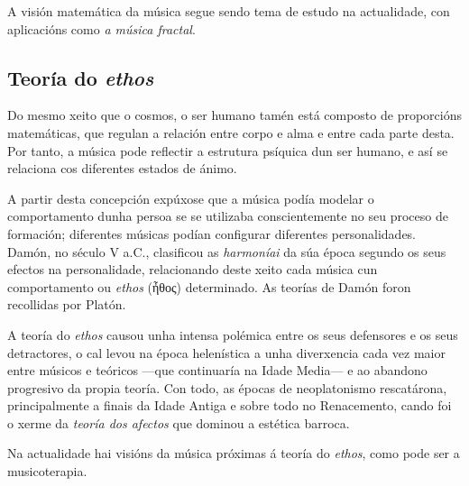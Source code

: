 A visión matemática da música segue sendo tema de estudo na actualidade,
con aplicacións como \emph{a música fractal}.

\hypertarget{teoruxeda-do--ethos}{%
\subsection*{\texorpdfstring{Teoría do
\emph{ethos}}{Teoría do ethos}}\label{teoruxeda-do--ethos}}

Do mesmo xeito que o cosmos, o ser humano tamén está composto de
proporcións matemáticas, que regulan a relación entre corpo e alma e
entre cada parte desta. Por tanto, a música pode reflectir a estrutura
psíquica dun ser humano, e así se relaciona cos diferentes estados de
ánimo.

A partir desta concepción expúxose que a música podía modelar o
comportamento dunha persoa se se utilizaba conscientemente no seu
proceso de formación; diferentes músicas podían configurar diferentes
personalidades. Damón, no século V a.C., clasificou as \emph{harmoníai}
da súa época segundo os seus efectos na personalidade, relacionando
deste xeito cada música cun comportamento ou \emph{ethos} (ἦθος)
determinado. As teorías de Damón foron recollidas por Platón.

A teoría do \emph{ethos} causou unha intensa polémica entre os seus
defensores e os seus detractores, o cal levou na época helenística a
unha diverxencia cada vez maior entre músicos e teóricos ---que
continuaría na Idade Media--- e ao abandono progresivo da propia teoría.
Con todo, as épocas de neoplatonismo rescatárona, principalmente a
finais da Idade Antiga e sobre todo no Renacemento, cando foi o xerme da
\emph{teoría dos afectos} que dominou a estética barroca.

Na actualidade hai visións da música próximas á teoría do \emph{ethos},
como pode ser a musicoterapia.

